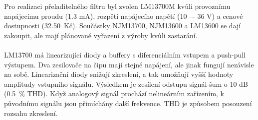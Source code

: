 \begin{center}
\begin{table}[h]
  \caption[Porovnání integrovaných obvodů se dvěma OTA]{\label{tab:Porovnání IC se dvěma OTA}Porovnání IC se dvěma OTA \cite{16}}
  \end{table}
\end{center}
\noindent Pro realizaci přeladitelného filtru byl zvolen LM13700M kvůli provoznímu napájecímu proudu (1.3 mA), rozpětí napájecího napětí (10 –- 36 V) a cenové dostupnosti (32.50\ Kč). Součástky NJM13700, NJM13600 a LM13600 se dají zakoupit, ale mají plánované vyřazení z výroby kvůli zastarání. \\
\\
LM13700 má linearizující diody a buffery s diferenciálním vstupem a push-pull výstupem. Dva zesilovače na čipu mají stejné napájení, ale jinak fungují nezávisle na sobě. Linearizační diody snižují zkreslení, a tak umožňují vyšší hodnoty amplitudy vstupního signálu. Výsledkem je zesílení odstupu signál-šum o 10 dB (0.5~\% THD). Když analogový signál prochází nelineárním zařízením, k původnímu signálu jsou přimíchány další frekvence. THD je způsobem posouzení rozsahu zkreslení.\\
